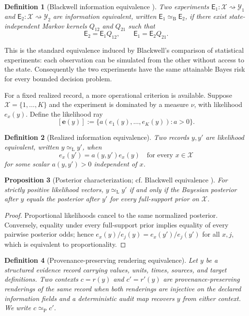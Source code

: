 \documentclass[11pt]{article}
\newtheorem{definition}{Definition}[section]
\newtheorem{proposition}[definition]{Proposition}
\newcommand{\Exp}{\mathsf E}
\begin{document}
\begin{definition}[Blackwell information equivalence \cite{blackwell1953}]\label{def:blackwell}
Two experiments $\Exp_1:\mathcal X\rightsquigarrow\mathcal Y_1$ and $\Exp_2:\mathcal X\rightsquigarrow\mathcal Y_2$ are information equivalent, written $\Exp_1\simeq_{\mathrm B}\Exp_2$, if there exist state-independent Markov kernels $Q_{12}$ and $Q_{21}$ such that
\[
 \Exp_2=\Exp_1Q_{12},\qquad \Exp_1=\Exp_2Q_{21}.
\]
\end{definition}

This is the standard equivalence induced by Blackwell's comparison of statistical experiments: each observation can be simulated from the other without access to the state. Consequently the two experiments have the same attainable Bayes risk for every bounded decision problem.

For a fixed realized record, a more operational criterion is available. Suppose $\mathcal X=\{1,\ldots,K\}$ and the experiment is dominated by a measure $\nu$, with likelihood $e_x(y)$. Define the likelihood ray
\[
 [\bm e(y)]:=\{a(e_1(y),\ldots,e_K(y)):a>0\}.
\]

\begin{definition}[Realized information equivalence]\label{def:ray}
Two records $y,y'$ are likelihood equivalent, written $y\simeq_{\mathrm L}y'$, when
\[
 e_x(y')=a(y,y')e_x(y)\quad\text{for every }x\in\mathcal X
\]
for some scalar $a(y,y')>0$ independent of $x$.
\end{definition}

\begin{proposition}[Posterior characterization; cf. Blackwell equivalence \cite{blackwell1953}]\label{prop:posterior-equivalence}
For strictly positive likelihood vectors, $y\simeq_{\mathrm L}y'$ if and only if the Bayesian posterior after $y$ equals the posterior after $y'$ for every full-support prior on $\mathcal X$.
\end{proposition}
\begin{proof}
Proportional likelihoods cancel to the same normalized posterior. Conversely, equality under every full-support prior implies equality of every pairwise posterior odds; hence $e_x(y)/e_j(y)=e_x(y')/e_j(y')$ for all $x,j$, which is equivalent to proportionality.
\end{proof}

\begin{definition}[Provenance-preserving rendering equivalence]
Let $y$ be a structured evidence record carrying values, units, times, sources, and target definitions. Two contexts $c=r(y)$ and $c'=r'(y)$ are provenance-preserving renderings of the same record when both renderings are injective on the declared information fields and a deterministic audit map recovers $y$ from either context. We write $c\simeq_{\mathrm P}c'$.
\end{definition}
\end{document}

